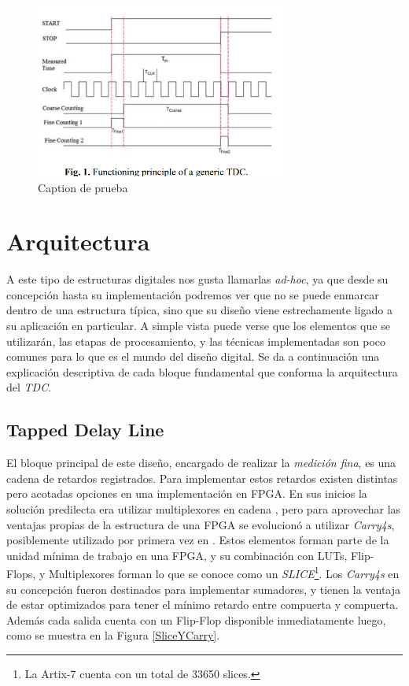 \begin{figure}[H]
      \centering
      \includegraphics[width=0.75\textwidth]{imagenes/Captura de pantalla 2024-07-25 103323.png}
      \caption{Caption de prueba}
      \label{fig:prueba}
\end{figure}
\clearpage




\section{Arquitectura}

A este tipo de estructuras digitales nos gusta llamarlas \textit{ad-hoc}, ya que desde su concepción hasta su
implementación podremos ver que no se puede enmarcar dentro de una estructura típica, sino que su diseño viene estrechamente ligado
a su aplicación en particular. A simple vista puede verse que los elementos que se utilizarán, las etapas de procesamiento,
y las técnicas implementadas son poco comunes para lo que es el mundo del diseño digital. Se da a continuación 
una explicación descriptiva de cada bloque fundamental que conforma la arquitectura del \textit{TDC}.

\subsection{Tapped Delay Line}
El bloque principal de este diseño, encargado de realizar la \textit{medición fina}, es una cadena de retardos registrados.
Para implementar estos retardos existen distintas pero acotadas opciones en una implementación en FPGA. En sus
inicios la solución predilecta era utilizar multiplexores en cadena \cite{kalisz_field-programmable-gate-array-based_1997},
pero para aprovechar las ventajas propias de la estructura de una FPGA se evolucionó a utilizar
\textit{Carry4s}, posiblemente utilizado por primera vez en \cite{favi_17ps_2009}. Estos elementos
forman parte de la unidad mínima de trabajo en una FPGA, y su combinación con LUTs, Flip-Flops, y Multiplexores forman lo que 
se conoce como un \textit{SLICE}\footnote[1]{La Artix-7 cuenta con un total de 33650 slices.}. 
Los \textit{Carry4s} en su concepción fueron destinados para implementar sumadores, y tienen la ventaja de estar optimizados
para tener el mínimo retardo entre compuerta y compuerta. Además cada salida cuenta con un Flip-Flop disponible inmediatamente
luego, como se muestra en la Figura \ref{SliceYCarry}.

